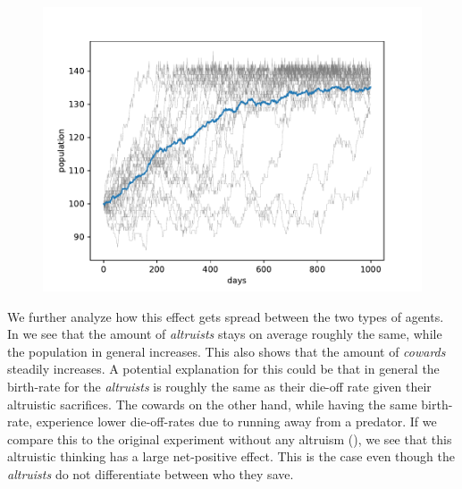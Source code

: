 \documentclass[sigconf]{acmart}
\newcommand{\todo}[1]{{\color{red}{#1}}}
\newcommand{\cowards}{\textit{cowards}\xspace}
\newcommand{\altruists}{\textit{altruists}\xspace}
\begin{document}
    \begin{figure}
        \includegraphics[width=\columnwidth]{figures/alt_cow_increase_total}
        \caption{\todo{leave this figure in as it shows that the total population varies a lot which cannot be seen as easily in plot 3}
        \todo{maybe set the same y-axis }
        }
        \label{fig:alt_cow_total}
    \end{figure}

    We further analyze how this effect gets spread between the two types of agents.
    In  we see that the amount of \altruists stays on average roughly the same, while the population in general increases.
    This also shows that the amount of \cowards steadily increases.
    A potential explanation for this could be that in general the birth-rate for the \altruists is roughly the same as their die-off rate given their altruistic sacrifices.
    The cowards on the other hand, while having the same birth-rate, experience lower die-off-rates due to running away from a predator.
    If we compare this to the original experiment without any altruism (), we see that this altruistic thinking has a large net-positive effect.
    This is the case even though the \altruists do not differentiate between who they save.
    \todo{play around with settings so that they do die out and the following experiment makes more sense}
\end{document}
